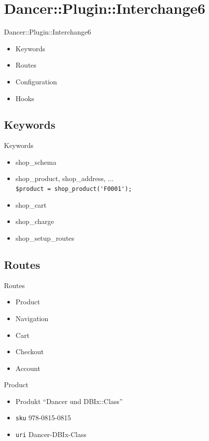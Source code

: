 \section{Dancer::Plugin::Interchange6}
\begin{frame}{Dancer::Plugin::Interchange6}
\begin{itemize}
\item Keywords
\item Routes
\item Configuration
\item Hooks
\end{itemize}
\end{frame}

\subsection{Keywords}
\begin{frame}[fragile]{Keywords}
\begin{itemize}
\item shop\_schema
\item shop\_product, shop\_address, ...\\
\verb|$product = shop_product('F0001');|
\item shop\_cart
\item shop\_charge
\item shop\_setup\_routes
\end{itemize}
\end{frame}

\subsection{Routes}
\begin{frame}{Routes}
\begin{itemize}
\item Product
\item Navigation
\item Cart
\item Checkout
\item Account
\end{itemize}
\end{frame}

\begin{frame}[fragile]{Product}
\begin{itemize}
\item Produkt ``Dancer und DBIx::Class''\\
\item \verb|sku| 978-0815-0815 \\
\item \verb|uri| Dancer-DBIx-Class
\end{itemize}
\end{frame}

